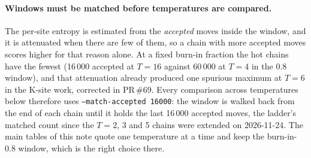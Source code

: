 \documentclass[11pt,a4paper]{article}
\begin{document}
\paragraph{Windows must be matched before temperatures are compared.} The
per-site entropy is estimated from the \emph{accepted} moves inside the
window, and it is attenuated when there are few of them, so a chain with more
accepted moves scores higher for that reason alone. At a fixed burn-in
fraction the hot chains have the fewest (16\,000 accepted at $T=16$ against
60\,000 at $T=4$ in the 0.8 window), and that attenuation already produced one
spurious maximum at $T=6$ in the K-site work, corrected in PR\,\#69. Every
comparison across temperatures below therefore uses
\texttt{--match-accepted 16000}: the window is walked back from the end of
each chain until it holds the last 16\,000 accepted moves, the ladder's
matched count since the $T=2$, 3 and 5 chains were extended on 2026-11-24.
The main tables of this note quote one temperature at a time and keep the
burn-in-0.8 window, which is the right choice there.
\end{document}
